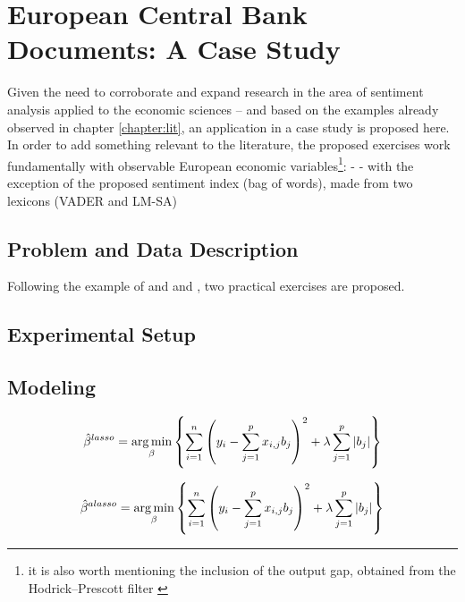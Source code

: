 \chapter{\textbf{European Central Bank Documents: A Case Study}}

Given the need to corroborate and expand research in the area of sentiment analysis applied to the economic sciences -- and based on the examples already observed in chapter \ref{chapter:lit}, an application in a case study is proposed here.\\

In order to add something relevant to the literature, the proposed exercises work fundamentally with observable European economic variables\footnote{it is also worth mentioning the inclusion of the output gap, obtained from the Hodrick–Prescott filter \citep{hodrick1997postwar}}: - - with the exception of the proposed sentiment index (bag of words), made from two lexicons (VADER and LM-SA)


\section{Problem and Data Description}

Following the example of \cite{shapiro2020measuring} and \cite{barsky2012information} and \cite{shapiro2020measuring}, two practical exercises are proposed. 



\section{Experimental Setup}

\section{Modeling}

\begin{align} \label{eq:lasso}
    \hat{\beta}^{lasso} = \operatorname*{arg\,min}_{\beta} \left\{ \sum_{i=1}^{n} \left( y_i - \sum_{j=1}^p x_{i,j}b_j \right)^2 + \lambda \sum_{j=1}^p |b_j| \right\}
\end{align}

\begin{align} \label{eq:lassoadaptive}
    \hat{\beta}^{alasso} = \operatorname*{arg\,min}_{\beta} \left\{\sum_{i=1}^{n} \left( y_i - \sum_{j=1}^p x_{i,j}b_j \right)^2 + \lambda \sum_{j=1}^p |b_j| \right\}
\end{align}

